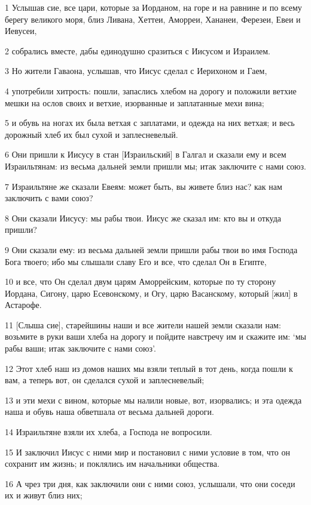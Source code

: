 \par 1 Услышав сие, все цари, которые за Иорданом, на горе и на равнине и по всему берегу великого моря, близ Ливана, Хеттеи, Аморреи, Хананеи, Ферезеи, Евеи и Иевусеи,
\par 2 собрались вместе, дабы единодушно сразиться с Иисусом и Израилем.
\par 3 Но жители Гаваона, услышав, что Иисус сделал с Иерихоном и Гаем,
\par 4 употребили хитрость: пошли, запаслись хлебом на дорогу и положили ветхие мешки на ослов своих и ветхие, изорванные и заплатанные мехи вина;
\par 5 и обувь на ногах их была ветхая с заплатами, и одежда на них ветхая; и весь дорожный хлеб их был сухой и заплесневелый.
\par 6 Они пришли к Иисусу в стан [Израильский] в Галгал и сказали ему и всем Израильтянам: из весьма дальней земли пришли мы; итак заключите с нами союз.
\par 7 Израильтяне же сказали Евеям: может быть, вы живете близ нас? как нам заключить с вами союз?
\par 8 Они сказали Иисусу: мы рабы твои. Иисус же сказал им: кто вы и откуда пришли?
\par 9 Они сказали ему: из весьма дальней земли пришли рабы твои во имя Господа Бога твоего; ибо мы слышали славу Его и все, что сделал Он в Египте,
\par 10 и все, что Он сделал двум царям Аморрейским, которые по ту сторону Иордана, Сигону, царю Есевонскому, и Огу, царю Васанскому, который [жил] в Астарофе.
\par 11 [Слыша сие], старейшины наши и все жители нашей земли сказали нам: возьмите в руки ваши хлеба на дорогу и пойдите навстречу им и скажите им: `мы рабы ваши; итак заключите с нами союз'.
\par 12 Этот хлеб наш из домов наших мы взяли теплый в тот день, когда пошли к вам, а теперь вот, он сделался сухой и заплесневелый;
\par 13 и эти мехи с вином, которые мы налили новые, вот, изорвались; и эта одежда наша и обувь наша обветшала от весьма дальней дороги.
\par 14 Израильтяне взяли их хлеба, а Господа не вопросили.
\par 15 И заключил Иисус с ними мир и постановил с ними условие в том, что он сохранит им жизнь; и поклялись им начальники общества.
\par 16 А чрез три дня, как заключили они с ними союз, услышали, что они соседи их и живут близ них;
